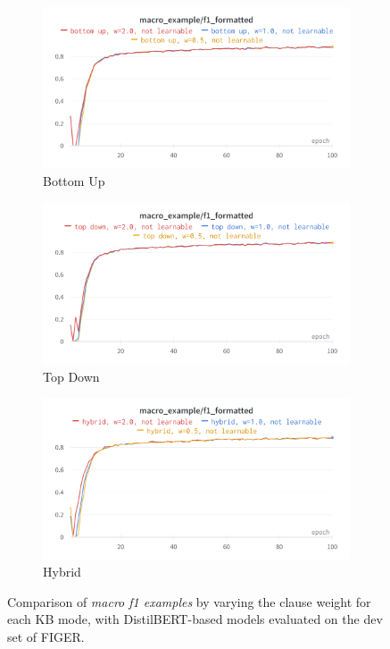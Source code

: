 \begin{figure}
     \centering
     \begin{subfigure}{0.8\textwidth}
         \centering
         \includegraphics[width=\textwidth]{figures/wandb_weights_bottom_up_macro_ex_f1.png}
         \caption{Bottom Up}
     \end{subfigure}
     \vfill
     \begin{subfigure}{0.8\textwidth}
         \centering
         \includegraphics[width=\textwidth]{figures/wandb_weights_top_down_macro_ex_f1.png}
         \caption{Top Down}
     \end{subfigure}
     \vfill
     \begin{subfigure}{0.8\textwidth}
         \centering
         \includegraphics[width=\textwidth]{figures/wandb_weights_hybrid_macro_ex_f1.png}
         \caption{Hybrid}
         \label{fig:wandb_weights_comparison_h}
    \end{subfigure}
        \caption{Comparison of \textit{macro f1 examples} by varying the clause weight for each KB mode, with DistilBERT-based models evaluated on the dev set of FIGER.}
        \label{fig:wandb_weights_comparison}
\end{figure}

